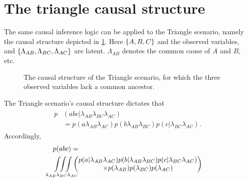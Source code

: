\section{The triangle causal structure}

The same causal inference logic can be applied to the Triangle scenario, namely the causal structure depicted in \cref{fig:TriDAG}. Here $\lbrace{A,B,C\rbrace}$ and the observed variables, and  $\lbrace{\Lambda_{AB},\Lambda_{BC},\Lambda_{AC}\rbrace}$ are latent. $\Lambda_{AB}$ denotes the common cause of $A$ and $B$, etc. 


\begin{figure}[!t]
\caption{The causal structure of the Triangle scenario, for which the three observed variables lack a common ancestor.}
 \label{fig:TriDAG}
\end{figure}


The Triangle scenario's causal structure dictates that
\begin{align}\begin{split}\label{eq:tristructure}
p&(abc|\lambda_{AB}\lambda_{BC}\lambda_{AC})\\
&=p(a\lambda_{AB}\lambda_{AC})p(b\lambda_{AB}\lambda_{BC})p(c|\lambda_{BC}\lambda_{AC}).
\end{split}\end{align}
Accordingly,
\begin{align}\label{eq:triintegration}
&p(abc)=\\\nonumber
&\int\!\!\int\limits_{\mathclap{\lambda_{AB}\lambda_{BC}\lambda_{AC}}}\!\!\int
\begin{pmatrix}p(a|\lambda_{AB}\lambda_{AC})p(b|\lambda_{AB}\lambda_{BC})p(c|\lambda_{BC}\lambda_{AC})\\
\times p(\lambda_{AB})p(\lambda_{BC})p(\lambda_{AC})\end{pmatrix}
\end{align}

